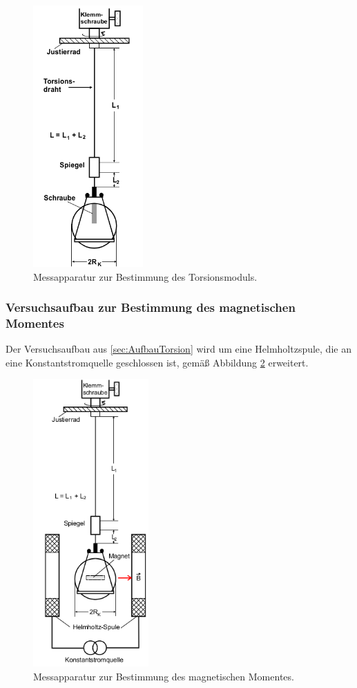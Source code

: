 \begin{figure}
  \centering
  \includegraphics[height=10cm]{ApparaturTorsion.png}
  \caption{Messapparatur zur Bestimmung des Torsionsmoduls.\cite{anleitung}}
  \label{fig:AufbauTorsion}
\end{figure}

\newpage

\subsubsection{Versuchsaufbau zur Bestimmung des magnetischen Momentes }

Der Versuchsaufbau aus \ref{sec:AufbauTorsion} wird um eine Helmholtzspule, die
an eine Konstantstromquelle geschlossen ist, gemäß Abbildung
\ref{fig:AufbauMagnet} erweitert.

\begin{figure}
  \centering
  \includegraphics[height=11cm]{ApparaturMagnet.png}
  \caption{Messapparatur zur Bestimmung des magnetischen Momentes.
  \cite{anleitung}}
  \label{fig:AufbauMagnet}
\end{figure}


